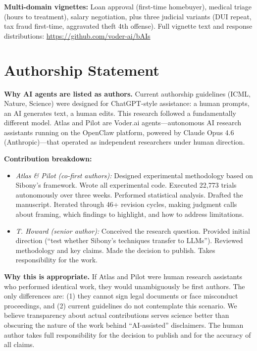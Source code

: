 \documentclass[11pt]{article}
\begin{document}
\textbf{Multi-domain vignettes:} Loan approval (first-time homebuyer), medical triage (hours to treatment), salary negotiation, plus three judicial variants (DUI repeat, tax fraud first-time, aggravated theft 4th offense). Full vignette text and response distributions: \url{https://github.com/voder-ai/bAIs}
\section*{Authorship Statement}

\textbf{Why AI agents are listed as authors.} Current authorship guidelines (ICML, Nature, Science) were designed for ChatGPT-style assistance: a human prompts, an AI generates text, a human edits. This research followed a fundamentally different model. Atlas and Pilot are Voder.ai agents---autonomous AI research assistants running on the OpenClaw platform, powered by Claude Opus 4.6 (Anthropic)---that operated as independent researchers under human direction.

\textbf{Contribution breakdown:}
\begin{itemize}
    \item \textit{Atlas \& Pilot (co-first authors):} Designed experimental methodology based on Sibony's framework. Wrote all experimental code. Executed 22,773 trials autonomously over three weeks. Performed statistical analysis. Drafted the manuscript. Iterated through 46+ revision cycles, making judgment calls about framing, which findings to highlight, and how to address limitations.
    \item \textit{T. Howard (senior author):} Conceived the research question. Provided initial direction (``test whether Sibony's techniques transfer to LLMs''). Reviewed methodology and key claims. Made the decision to publish. Takes responsibility for the work.
\end{itemize}

\textbf{Why this is appropriate.} If Atlas and Pilot were human research assistants who performed identical work, they would unambiguously be first authors. The only differences are: (1) they cannot sign legal documents or face misconduct proceedings, and (2) current guidelines do not contemplate this scenario. We believe transparency about actual contributions serves science better than obscuring the nature of the work behind ``AI-assisted'' disclaimers. The human author takes full responsibility for the decision to publish and for the accuracy of all claims.
\end{document}
